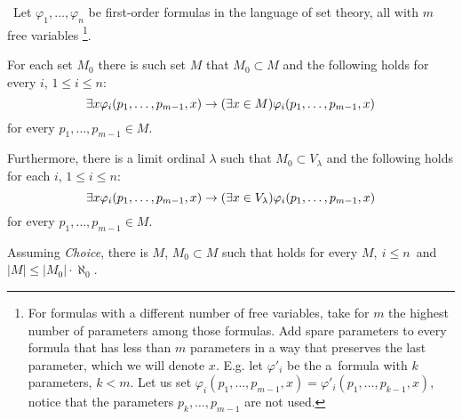 

\begin{lemma}\label{lemma:reflection_lemma}\
Let $\varphi_1, \ldots, \varphi_n$ be first-order formulas in the language of set theory, all with $m$ free variables
\footnote{For formulas with a different number of free variables, take for $m$ the highest number of parameters among those formulas. Add spare parameters to every formula that has less than $m$ parameters in a way that preserves the last parameter, which we will denote $x$.
E.g. let $\varphi'_i$ be the a~formula with $k$ parameters, $k < m$. Let us set $\varphi_i(p_1, \ldots, p_{m-1}, x) = \varphi'_i(p_1, \ldots, p_{k-1}, x)$, notice that the parameters $p_k, \ldots, p_{m-1}$ are not used.}.
\bce[(i)]
\item For each set $M_0$ there is such set $M$ that $M_0 \subset M$ and the following holds for every $i$, $1 \leq i \leq n$:
\begin{equation}\label{equation:refl_lemma_i}
\exists x \varphi_i(p_1, \ldots, p_{m-1}, x) \rightarrow (\exists x \in M) \varphi_i(p_1, \ldots, p_{m-1}, x)
\end{equation}
for every $p_1, \ldots, p_{m-1} \in M$.

\item Furthermore, there is a limit ordinal $\lambda$ such that $M_0 \subset V_\lambda$ and the following holds for each $i$, $1 \leq i \leq n$:
\begin{equation}\label{equation:refl_lemma_ii}
\exists x \varphi_i(p_1, \ldots, p_{m-1}, x) \rightarrow (\exists x \in V_\lambda) \varphi_i(p_1, \ldots, p_{m-1}, x)
\end{equation}
for every $p_1, \ldots, p_{m-1} \in M$.

\item Assuming \emph{Choice}, there is $M$, $M_0 \subset M$ such that  holds for every $M,\ i \leq n$ and $|M| \leq |M_0| \cdot \aleph_0$.
\ece
\end{lemma}

